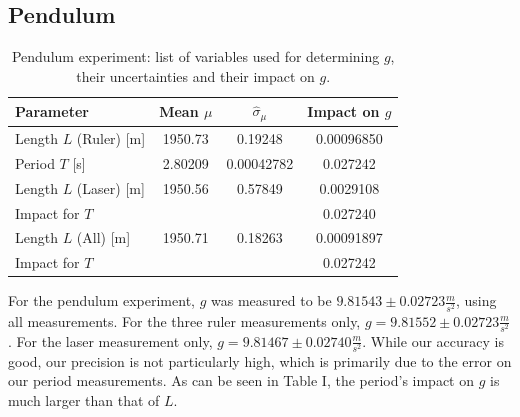\documentclass[a4paper,%
                aps,%
                prl,%
                amsfonts,%
                amssymb,%
                amsmath,%
                nobibnotes,%
                twocolumn, %
                twoside,%
                balancelastpage,%
                eqsecnum] %
                {revtex4-1}
\begin{document}
\subsection{Pendulum}

\begin{table}[h]
  \caption{Pendulum experiment: list of variables used for determining $g$,
    their uncertainties and their impact on $g$.}
  \centering
  \begin{tabular}{lccc}
    Parameter & Mean $\mu$ &  $\hat{\sigma}_{\mu}$ &  Impact on $g$ \\\toprule
    Length $L$ (Ruler) [\si{\m}] & \num[round-precision=6,round-mode=figures]{1950.73} & \num[round-precision=5,round-mode=figures]{0.19248} & \num[round-precision=5,round-mode=figures]{0.00096850} \\
    Period $T$ [\si{\s}]  & \num[round-precision=6,round-mode=figures]{2.80209} & \num[round-precision=5,round-mode=figures]{0.00042782} & \num[round-precision=5,round-mode=figures]{0.027242} \\
    Length $L$ (Laser) [\si{\m}] & \num[round-precision=6,round-mode=figures]{1950.56} & \num[round-precision=5,round-mode=figures]{0.57849} & \num[round-precision=5,round-mode=figures]{0.0029108} \\
    Impact for $T$  & \num[round-precision=6,round-mode=figures]{} & \num[round-precision=5,round-mode=figures]{} & \num[round-precision=5,round-mode=figures]{0.027240} \\
    Length $L$ (All) [\si{\m}] & \num[round-precision=6,round-mode=figures]{1950.71} & \num[round-precision=5,round-mode=figures]{0.18263} & \num[round-precision=5,round-mode=figures]{0.00091897} \\
    Impact for $T$  & \num[round-precision=6,round-mode=figures]{} & \num[round-precision=5,round-mode=figures]{} & \num[round-precision=5,round-mode=figures]{0.027242} \\
  \end{tabular}
\end{table}

For the pendulum experiment, $g$ was measured to be $9.81543 \pm 0.02723
\frac{m}{s^2}$, using all measurements. For the three ruler measurements only,
$g = 9.81552 \pm 0.02723 \frac{m}{s^2}$. For the laser measurement only, $g =
9.81467 \pm 0.02740 \frac{m}{s^2}$. While our accuracy is good, our precision is
not particularly high, which is primarily due to the error on our period
measurements. As can be seen in Table I, the period's impact on $g$ is much
larger than that of $L$.
\end{document}
